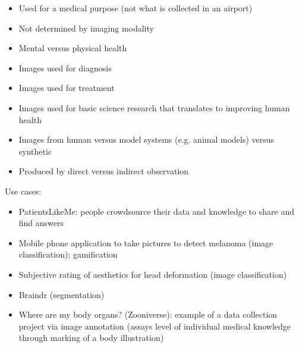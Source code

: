 \documentclass[10pt,twocolumn,letterpaper]{article}
\begin{document}
\begin{itemize}
    \item Used for a medical purpose (not what is collected in an airport)
    \item Not determined by imaging modality
    \item Mental versus physical health 
    \item Images used for diagnosis
    \item Images used for treatment
    \item Images used for basic science research that translates to improving human health
    \item Images from human versus model systems (e.g. animal models) versus synthetic
    \item Produced by direct versus indirect observation
\end{itemize}

Use cases:
\begin{itemize}
    \item PatientsLikeMe: people crowdsource their data and knowledge to share and find answers 
    \item Mobile phone application to take pictures to detect melanoma  (image classification); gamification
    \item Subjective rating of aesthetics for head deformation (image classification)
    \item Braindr (segmentation) 
    \item Where are my body organs? (Zooniverse): example of a data collection project via image annotation (assays level of individual medical knowledge through marking of a body illustration)
\end{itemize}


\end{document}
